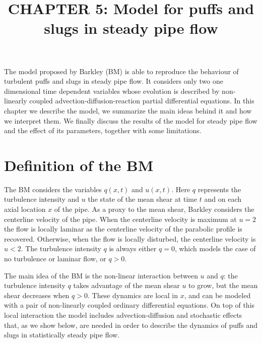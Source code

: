 \documentclass{article}
\title{CHAPTER 5: Model for puffs and slugs in steady pipe flow}
\date{}
\begin{document}
\maketitle
The model proposed by Barkley \cite{barkley2011modeling} (BM) is able to reproduce the behaviour of turbulent puffs and slugs in steady pipe flow. It considers only two one dimensional time dependent variables whose evolution is described by non-linearly coupled advection-diffusion-reaction partial differential equations. In this chapter we describe the model, we summarize the main ideas behind it and how we interpret them. We finally discuss the results of the model for steady pipe flow and the effect of its parameters, together with some limitations. 





\section{Definition of the BM}
The BM considers the variables $q\left(x,t\right)$ and $u\left(x,t\right)$. Here $q$ represents the turbulence intensity and $u$ the state of the mean shear at time $t$ and on each axial location $x$ of the pipe. As a proxy to the mean shear, Barkley considers the centerline velocity of the pipe. When the centerline velocity is maximum at $u=2$ the flow is locally laminar as the centerline velocity of the parabolic profile is recovered. Otherwise, when the flow is locally disturbed, the centerline velocity is $u < 2$. The turbulence intensity $q$ is always either $q=0$, which models the case of no turbulence or laminar flow, or $q>0$. 

The main idea of the BM is the non-linear interaction between $u$ and $q$: the turbulence intensity $q$ takes advantage of the mean shear $u$ to grow, but the mean shear decreases when $q>0$. These dynamics are local in $x$, and can be modeled with a pair of non-linearly coupled ordinary differential equations. On top of this local interaction the model includes advection-diffusion and stochastic effects that, as we show below, are needed in order to describe the dynamics of puffs and slugs in statistically steady pipe flow. 
\end{document}
